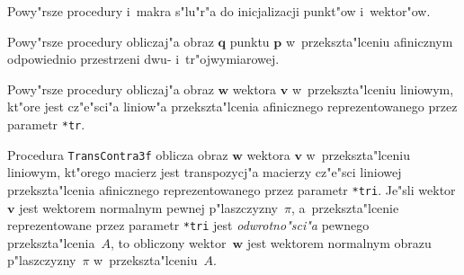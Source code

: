 \vspace{\bigskipamount}
Powy"rsze procedury i~makra s"lu"r"a do inicjalizacji punkt"ow i~wektor"ow.

\vspace{\bigskipamount}
Powy"rsze procedury obliczaj"a obraz $\bm{q}$ punktu $\bm{p}$
w~przekszta"lceniu afinicznym odpowiednio przestrzeni dwu-
i~tr"ojwymiarowej.

\vspace{\bigskipamount}
Powy"rsze procedury obliczaj"a obraz $\bm{w}$ wektora $\bm{v}$
w~przekszta"lceniu liniowym, kt"ore jest cz"e"sci"a liniow"a
przekszta"lcenia afinicznego reprezentowanego przez parametr \texttt{*tr}.

\vspace{\bigskipamount}
Procedura \texttt{TransContra3f} oblicza obraz $\bm{w}$ wektora $\bm{v}$
w~przekszta"lceniu liniowym, kt"orego macierz jest transpozycj"a macierzy
cz"e"sci liniowej przekszta"lcenia afinicznego reprezentowanego przez
parametr \texttt{*tri}. Je"sli wektor $\bm{v}$ jest wektorem normalnym
pewnej p"laszczyzny~$\pi$, a~przekszta"lcenie reprezentowane przez parametr
\texttt{*tri} jest \emph{odwrotno"sci"a} pewnego przekszta"lcenia~$A$, to
obliczony wektor~$\bm{w}$ jest wektorem normalnym obrazu p"laszczyzny~$\pi$
w~przekszta"lceniu~$A$.

